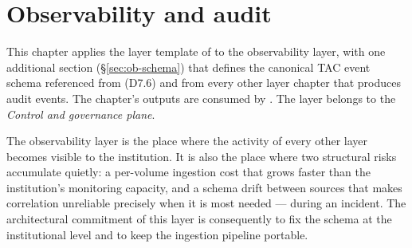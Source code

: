 
\chapter{Observability and audit}
\label{ch:observability}

\begin{caveatbox}[Dependencies]
\noindent This chapter applies the layer template of
 to the observability layer, with one
additional section (\S\ref{sec:ob-schema}) that defines the
canonical TAC event schema referenced from 
(D7.6) and from every other layer chapter that produces audit
events. The chapter's outputs are consumed by
. The
layer belongs to the \emph{Control and governance plane}.
\end{caveatbox}

The observability layer is the place where the activity of every
other layer becomes visible to the institution. It is also the
place where two structural risks accumulate quietly: a per-volume
ingestion cost that grows faster than the institution's monitoring
capacity, and a schema drift between sources that makes correlation
unreliable precisely when it is most needed --- during an incident.
The architectural commitment of this layer is consequently to fix
the schema at the institutional level and to keep the ingestion
pipeline portable.

